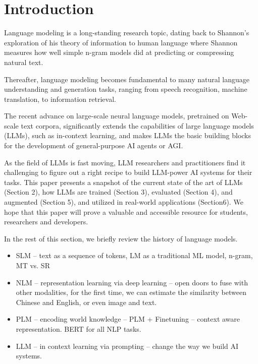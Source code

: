 \section{Introduction}


Language modeling is a long-standing research topic, dating back to Shannon's exploration of his  theory of information to human language where Shannon measures how well simple n-gram models did at predicting or compressing natural text. 

Thereafter, language modeling becomes fundamental to many natural language understanding and generation tasks, ranging from speech recognition, machine translation, to information retrieval.

The recent advance on large-scale neural language models, pretrained on Web-scale text corpora, significantly extends the capabilities of large language models (LLMs), such as in-context learning, and makes LLMs the basic building blocks for the development of general-purpose AI agents or AGI.

As the field of LLMs is fast moving, LLM researchers and practitioners find it challenging to figure out a right recipe to build LLM-power AI systems for their tasks. This paper presents a snapshot of the current state of the art of LLMs (Section 2), how LLMs are trained (Section 3), evaluated (Section 4), and augmented (Section 5), and utilized in real-world applications (Section6). We hope that this paper will prove a valuable and accessible resource for students, researchers and developers. 

In the rest of this section, we briefly review the history of language models.
\begin{itemize}
    \item SLM -- text as a sequence of tokens, LM as a traditional ML model, n-gram, MT vs. SR 
    \item NLM -- representation learning via deep learning -- open doors to fuse with other modalities, for the first time, we can estimate the similarity between Chinese and English, or even image and text.
    \item PLM -- encoding world knowledge -- PLM + Finetuning -- context aware representation. BERT for all NLP tasks.
    \item LLM -- in context learning via prompting -- change the way we build AI systems.
\end{itemize}


